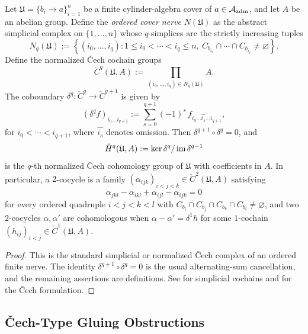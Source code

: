 \begin{lemma}
\label{lem:cech-complex-formal}
Let $\mathfrak{U}=\{b_i\to a\}_{i=1}^n$ be a finite cylinder-algebra cover of
$a\in\mathcal{A}_{\mathrm{adm}}$, and let $A$ be an abelian group.  Define the \emph{ordered cover
nerve} $N(\mathfrak{U})$ as the abstract simplicial complex on
$\{1,\dots,n\}$ whose $q$-simplices are the strictly increasing tuples
\[
N_q(\mathfrak{U})
:=
\left\{
(i_0,\dots,i_q): 1\le i_0<\cdots<i_q\le n,\ 
C_{b_{i_0}}\cap\cdots\cap C_{b_{i_q}}\neq\varnothing
\right\}.
\]
Define the normalized \v{C}ech cochain groups
\[
\check{C}^q(\mathfrak{U},A)
:=
\prod_{(i_0,\dots,i_q)\in N_q(\mathfrak{U})} A.
\]
The coboundary $\delta^q\colon \check{C}^q\to \check{C}^{q+1}$ is given by
\[
(\delta^q f)_{i_0\dots i_{q+1}}
:=
\sum_{s=0}^{q+1} (-1)^s\, f_{i_0\dots\widehat{i_s}\dots i_{q+1}},
\]
for $i_0<\cdots<i_{q+1}$, where $\widehat{i_s}$ denotes omission.  Then
$\delta^{q+1}\circ\delta^q=0$, and
\[
\check{H}^q(\mathfrak{U},A)
:=
\ker\delta^q / \operatorname{im}\delta^{q-1}
\]
is the $q$-th normalized \v{C}ech cohomology group of $\mathfrak{U}$ with
coefficients in $A$.  In particular, a $2$-cocycle is a family
$(\alpha_{ijk})_{i<j<k}\in\check{C}^2(\mathfrak{U},A)$ satisfying
\begin{equation}\label{eq:cocycle-condition}
\alpha_{jkl} - \alpha_{ikl} + \alpha_{ijl} - \alpha_{ijk} = 0
\end{equation}
for every ordered quadruple $i<j<k<l$ with
$C_{b_i}\cap C_{b_j}\cap C_{b_k}\cap C_{b_l}\neq\varnothing$, and two
$2$-cocycles $\alpha,\alpha'$ are
cohomologous when $\alpha-\alpha'=\delta^1 h$ for some
$1$-cochain $(h_{ij})_{i<j}\in\check{C}^1(\mathfrak{U},A)$.
\end{lemma}

\begin{proof}
This is the standard simplicial or normalized \v{C}ech complex of an ordered
finite nerve.  The identity $\delta^{q+1}\circ\delta^q=0$ is the usual
alternating-sum cancellation, and the remaining assertions are definitions.
See \cite{HatcherAlgebraicTopology} for simplicial cochains and
\cite[Tag~01FG]{StacksProject} for the \v{C}ech formulation.
\end{proof}

\subsection{\v{C}ech-Type Gluing Obstructions}

